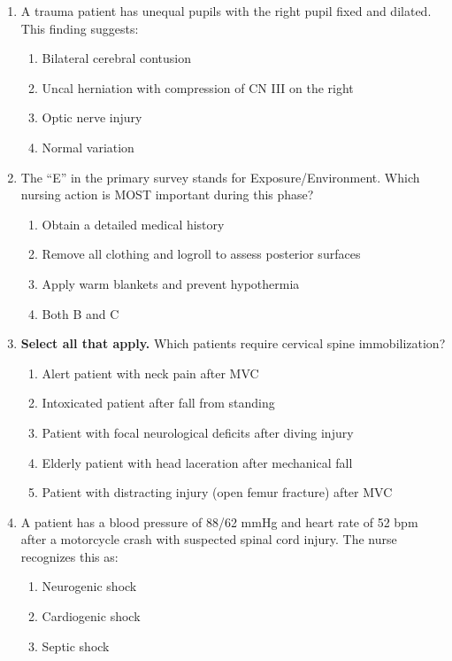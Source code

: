 \documentclass[11pt]{article}
\begin{document}
\begin{enumerate}
\item A trauma patient has unequal pupils with the right pupil fixed and dilated. This finding suggests:

\begin{enumerate}[label=\Alph*.]
    \item Bilateral cerebral contusion
    \item Uncal herniation with compression of CN III on the right
    \item Optic nerve injury
    \item Normal variation
\end{enumerate}

\item The ``E'' in the primary survey stands for Exposure/Environment. Which nursing action is MOST important during this phase?

\begin{enumerate}[label=\Alph*.]
    \item Obtain a detailed medical history
    \item Remove all clothing and logroll to assess posterior surfaces
    \item Apply warm blankets and prevent hypothermia
    \item Both B and C
\end{enumerate}

\item \textbf{Select all that apply.} Which patients require cervical spine immobilization?

\begin{enumerate}[label=\Alph*.]
    \item Alert patient with neck pain after MVC
    \item Intoxicated patient after fall from standing
    \item Patient with focal neurological deficits after diving injury
    \item Elderly patient with head laceration after mechanical fall
    \item Patient with distracting injury (open femur fracture) after MVC
\end{enumerate}

\item A patient has a blood pressure of 88/62 mmHg and heart rate of 52 bpm after a motorcycle crash with suspected spinal cord injury. The nurse recognizes this as:

\begin{enumerate}[label=\Alph*.]
Hypovolemic shock
    \item Neurogenic shock
    \item Cardiogenic shock
    \item Septic shock
\end{enumerate}


\end{enumerate}
\end{document}
